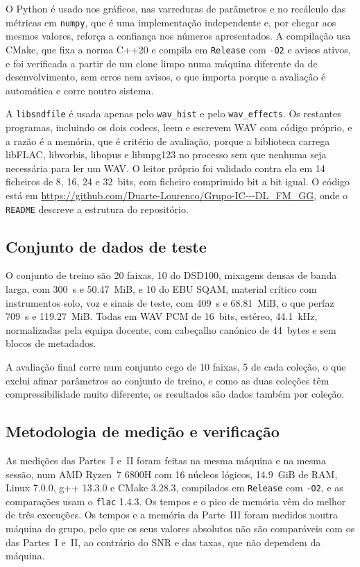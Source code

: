 \documentclass[a4paper,11pt]{article}
\newcommand{\prog}[1]{\texttt{#1}}
\begin{document}
O Python é usado nos gráficos, nas varreduras de parâmetros e no recálculo das
métricas em \prog{numpy}, que é uma implementação independente e, por chegar aos
mesmos valores, reforça a confiança nos números apresentados. A compilação usa
CMake, que fixa a norma C++20 e compila em \texttt{Release} com \texttt{-O2} e
avisos ativos, e foi verificada a partir de um clone limpo numa máquina
diferente da de desenvolvimento, sem erros nem avisos, o que importa porque a
avaliação é automática e corre noutro sistema.

A \texttt{libsndfile} é usada apenas pelo \prog{wav\_hist} e pelo
\prog{wav\_effects}. Os restantes programas, incluindo os dois codecs, leem e
escrevem WAV com código próprio, e a razão é a memória, que é critério de
avaliação, porque a biblioteca carrega libFLAC, libvorbis, libopus e libmpg123
no processo sem que nenhuma seja necessária para ler um WAV. O leitor próprio
foi validado contra ela em 14 ficheiros de 8, 16, 24 e \num{32}~bits, com
ficheiro comprimido bit a bit igual. O código está em
\url{https://github.com/Duarte-Lourenco/Grupo-IC---DL_FM_GG}, onde o
\texttt{README} descreve a estrutura do repositório.

\subsection{Conjunto de dados de teste}
\label{sec:dados}
O conjunto de treino são 20 faixas, 10 do DSD100, mixagens densas de banda
larga, com \SI{300}{\second} e \SI{50,47}{MiB}, e 10 do EBU SQAM, material
crítico com instrumentos solo, voz e sinais de teste, com \SI{409}{\second} e
\SI{68,81}{MiB}, o que perfaz \SI{709}{\second} e \SI{119,27}{MiB}. Todas em
WAV PCM de \num{16}~bits, estéreo, \SI{44,1}{\kilo\hertz}, normalizadas pela
equipa docente, com cabeçalho canónico de \num{44}~bytes e sem blocos de
metadados.
 
A avaliação final corre num conjunto cego de 10 faixas, 5 de cada coleção, o que
exclui afinar parâmetros ao conjunto de treino, e como as duas coleções têm
compressibilidade muito diferente, os resultados são dados também por coleção.
 

\subsection{Metodologia de medição e verificação}
\label{sec:metodo}
As medições das Partes~I e~II foram feitas na mesma máquina e na mesma sessão,
num AMD Ryzen~7 6800H com 16 núcleos lógicos, \SI{14,9}{GiB} de RAM, Linux
7.0.0, g++ 13.3.0 e CMake 3.28.3, compilados em \texttt{Release} com
\texttt{-O2}, e as comparações usam o \prog{flac} 1.4.3. Os tempos e o pico de
memória vêm do melhor de três execuções. Os tempos e a memória da Parte~III
foram medidos noutra máquina do grupo, pelo que os seus valores absolutos não
são comparáveis com os das Partes~I e~II, ao contrário do SNR e das taxas, que
não dependem da máquina.
\end{document}
